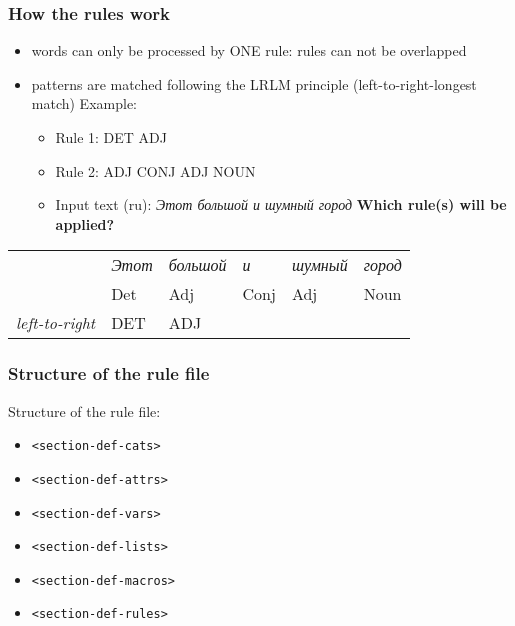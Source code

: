 \documentclass[10pt,xetex]{beamer} %
\begin{document}
\begin{frame}
\frametitle{How the rules work}
\begin{itemize}
\item words can only be processed by ONE rule: rules can not be overlapped
\item patterns are matched following the LRLM principle (left-to-right-longest match)
\newline Example:
\begin{itemize}
  \item Rule 1: DET ADJ
  \item Rule 2: ADJ CONJ ADJ NOUN
   \item Input text (ru): \emph{Этот большой и шумный город}
\newline 
\newline \textbf{Which rule(s) will be applied?}
\newline
\newline
\end{itemize}
\end{itemize}
\begin{block}{}
\begin{tabular}{llllll}

 & \emph{Этот} & \emph{большой} &  \emph{и} & \emph{шумный} & \emph{город} \\
 & Det  &  Adj &   Conj  &   Adj &  Noun\\
\emph{left-to-right} & DET & ADJ &&&\\
\end{tabular}
\end{block}

\end{frame}

\begin{frame}
\frametitle{Structure of the rule file}
Structure of the rule file:
\begin{itemize}
\item \texttt{<section-def-cats>}
\item \texttt{<section-def-attrs>}
\item \texttt{<section-def-vars>}
\item \texttt{<section-def-lists>}
\item \texttt{<section-def-macros>}
\item \texttt{<section-def-rules>}

\end{itemize}
\end{frame}
\end{document}
